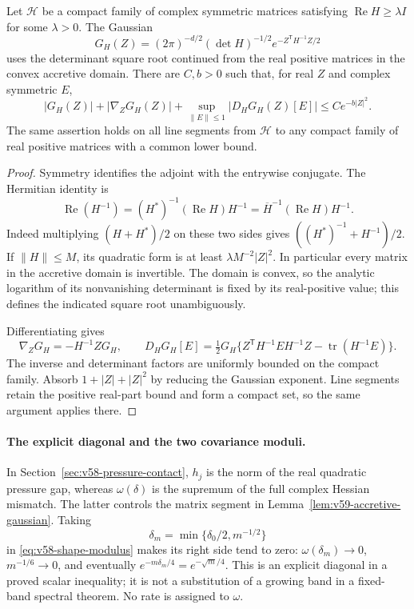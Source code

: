 \begin{lemma}
\label{lem:v59-accretive-gaussian}
Let $\mathcal H$ be a compact family of complex symmetric matrices
satisfying $\operatorname{Re}H\ge\lambda I$ for some $\lambda>0$.
The Gaussian
\[
 G_H(Z)=(2\pi)^{-d/2}(\det H)^{-1/2}
                         e^{-Z^{\mathsf T}H^{-1}Z/2}
\]
uses the determinant square root continued from the real positive
matrices in the convex accretive domain. There are $C,b>0$ such that,
for real $Z$ and complex symmetric $E$,
\begin{equation}\label{eq:v59-gaussian-derivatives}
 |G_H(Z)|+|\nabla_ZG_H(Z)|+
        \sup_{\|E\|\le1}|D_HG_H(Z)[E]|\le Ce^{-b|Z|^2}.
\end{equation}
The same assertion holds on all line segments from $\mathcal H$ to any
compact family of real positive matrices with a common lower bound.
\end{lemma}
\begin{proof}
Symmetry identifies the adjoint with the entrywise conjugate. The
Hermitian identity is
\begin{equation}\label{eq:v59-inverse-real-part}
 \operatorname{Re}(H^{-1})
   =(H^*)^{-1}(\operatorname{Re}H)H^{-1}
   =\overline H^{-1}(\operatorname{Re}H)H^{-1}.
\end{equation}
Indeed multiplying $(H+H^*)/2$ on these two sides gives
$((H^*)^{-1}+H^{-1})/2$. If $\|H\|\le M$, its quadratic form is
at least $\lambda M^{-2}|Z|^2$. In particular every matrix in the
accretive domain is invertible. The domain is convex, so the analytic
logarithm of its nonvanishing determinant is fixed by its real-positive
value; this defines the indicated square root unambiguously.

Differentiating gives
\[
 \nabla_ZG_H=-H^{-1}ZG_H,\qquad
 D_HG_H[E]=\tfrac12G_H
 \{Z^{\mathsf T}H^{-1}EH^{-1}Z-\operatorname{tr}(H^{-1}E)\}.
\]
The inverse and determinant factors are uniformly bounded on the compact
family. Absorb $1+|Z|+|Z|^2$ by reducing the Gaussian exponent. Line
segments retain the positive real-part bound and form a compact set,
so the same argument applies there.
\end{proof}

\paragraph{The explicit diagonal and the two covariance moduli.}
In Section~\ref{sec:v58-pressure-contact}, $h_j$ is the norm of the real
quadratic pressure gap, whereas $\omega(\delta)$ is the supremum of
the full complex Hessian mismatch. The latter controls the matrix
segment in Lemma~\ref{lem:v59-accretive-gaussian}. Taking
\[
 \delta_m=\min\{\delta_0/2,m^{-1/2}\}
\]
in \eqref{eq:v58-shape-modulus} makes its right side tend to zero:
$\omega(\delta_m)\to0$, $m^{-1/6}\to0$, and eventually
$e^{-m\delta_m/4}=e^{-\sqrt m/4}$. This is an explicit diagonal in a
proved scalar inequality; it is not a substitution of a growing band
in a fixed-band spectral theorem. No rate is assigned to $\omega$.

